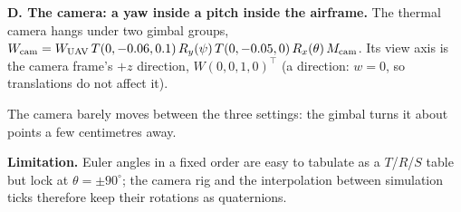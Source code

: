 \textbf{D. The  camera: a yaw inside a pitch inside the airframe.} The thermal camera hangs under two gimbal
groups, $\wgDchain$. Its view axis is the camera frame's $+z$ direction, $W(0,0,1,0)^\top$ (a direction: $w=0$, so
translations do not affect it).

\begin{table}[htbp]
\caption{Group D: camera position and view axis of UAV (uncrewed aerial vehicle)~1 for the starting gimbal angles and two other settings; the
pitch alone sets the angle below the horizon.}\label{tab:wgD}
\centering\footnotesize\wgD
\end{table}

The camera barely moves between the three settings: the gimbal turns it about points a few centimetres away.



\textbf{Limitation.} Euler angles in a fixed order are easy to tabulate as a $T$/$R$/$S$ table but lock at
$\theta=\pm90^\circ$; the camera rig and the interpolation between simulation ticks therefore keep their rotations as
quaternions.
